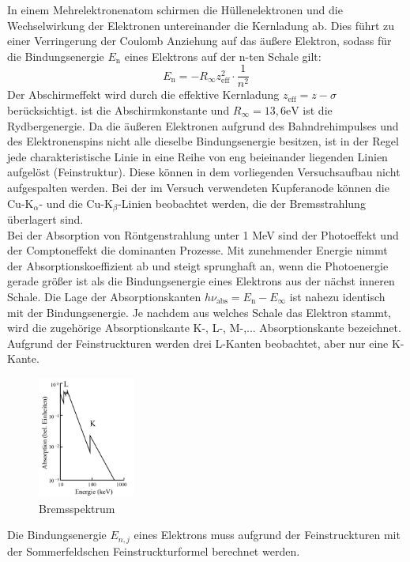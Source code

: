 In einem Mehrelektronenatom schirmen die Hüllenelektronen und die Wechselwirkung der Elektronen untereinander die Kernladung ab.
Dies führt zu einer Verringerung der Coulomb Anziehung auf das äußere Elektron, sodass für die Bindungsenergie $E_\text{n}$ eines Elektrons auf der n-ten Schale gilt:
\begin{equation}
    E_\text{n} = -R_{\infty}z_{\text{eff}}^2 \cdot \frac{1}{n^2}
    \label{eqn:gl2}
\end{equation}
Der Abschirmeffekt wird durch die effektive Kernladung $z_{\text{eff}} = z - \sigma$ berücksichtigt. 
\sigma ist die Abschirmkonstante und $R_{\infty} = 13,6 \text{eV}$ ist die Rydbergenergie.
Da die äußeren Elektronen aufgrund des Bahndrehimpulses und des Elektronenspins nicht alle dieselbe Bindungsenergie besitzen, ist in der Regel jede charakteristische Linie in eine Reihe von eng beieinander liegenden Linien aufgelöst (Feinstruktur).
Diese können in dem vorliegenden Versuchsaufbau nicht aufgespalten werden.
Bei der im Versuch verwendeten Kupferanode können die $\text{Cu-K}_{\alpha}\text{- und die Cu-K}_{\beta}\text{-Linien}$ beobachtet werden, die der Bremsstrahlung überlagert sind.\\
\noindent
Bei der Absorption von Röntgenstrahlung unter 1 MeV sind der Photoeffekt und der Comptoneffekt die dominanten Prozesse.
Mit zunehmender Energie nimmt der Absorptionskoeffizient ab und steigt sprunghaft an, wenn die Photoenergie gerade größer ist als die Bindungsenergie eines Elektrons aus der nächst inneren Schale.
Die Lage der Absorptionskanten $h \nu_{\text{abs}} = E_{\text{n}} - E_{\infty}$ ist nahezu identisch mit der Bindungsenergie.
Je nachdem aus welches Schale das Elektron stammt, wird die zugehörige Absorptionskante K-, L-, M-,... Absorptionskante bezeichnet.
Aufgrund der Feinstruckturen werden drei L-Kanten beobachtet, aber nur eine K-Kante.
\begin{figure}
    \centering
    \includegraphics[height=4.0cm]{data/abb2.jpg}
    \caption{Bremsspektrum \cite{V602}}
    \label{fig:abb2}
\end{figure}
Die Bindungsenergie $E_{n,j}$ eines Elektrons muss aufgrund der Feinstruckturen mit der Sommerfeldschen Feinstruckturformel berechnet werden.
